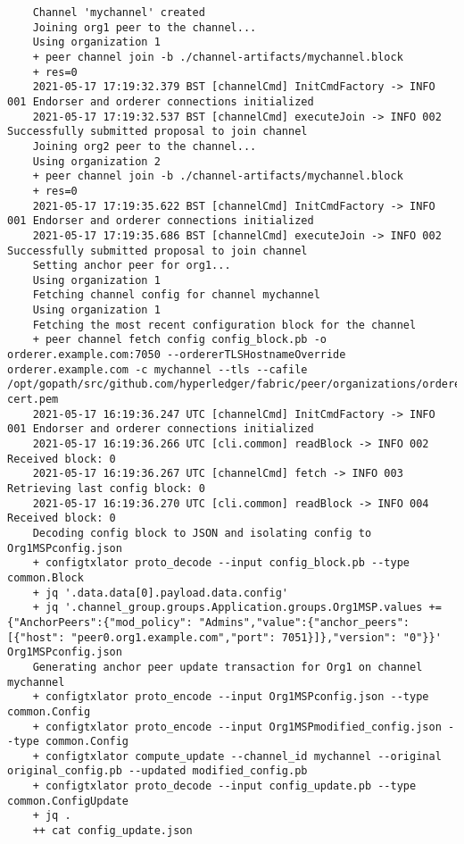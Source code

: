 \begin{lstlisting}
    Channel 'mychannel' created
    Joining org1 peer to the channel...
    Using organization 1
    + peer channel join -b ./channel-artifacts/mychannel.block
    + res=0
    2021-05-17 17:19:32.379 BST [channelCmd] InitCmdFactory -> INFO 001 Endorser and orderer connections initialized
    2021-05-17 17:19:32.537 BST [channelCmd] executeJoin -> INFO 002 Successfully submitted proposal to join channel
    Joining org2 peer to the channel...
    Using organization 2
    + peer channel join -b ./channel-artifacts/mychannel.block
    + res=0
    2021-05-17 17:19:35.622 BST [channelCmd] InitCmdFactory -> INFO 001 Endorser and orderer connections initialized
    2021-05-17 17:19:35.686 BST [channelCmd] executeJoin -> INFO 002 Successfully submitted proposal to join channel
    Setting anchor peer for org1...
    Using organization 1
    Fetching channel config for channel mychannel
    Using organization 1
    Fetching the most recent configuration block for the channel
    + peer channel fetch config config_block.pb -o orderer.example.com:7050 --ordererTLSHostnameOverride orderer.example.com -c mychannel --tls --cafile /opt/gopath/src/github.com/hyperledger/fabric/peer/organizations/ordererOrganizations/example.com/orderers/orderer.example.com/msp/tlscacerts/tlsca.example.com-cert.pem
    2021-05-17 16:19:36.247 UTC [channelCmd] InitCmdFactory -> INFO 001 Endorser and orderer connections initialized
    2021-05-17 16:19:36.266 UTC [cli.common] readBlock -> INFO 002 Received block: 0
    2021-05-17 16:19:36.267 UTC [channelCmd] fetch -> INFO 003 Retrieving last config block: 0
    2021-05-17 16:19:36.270 UTC [cli.common] readBlock -> INFO 004 Received block: 0
    Decoding config block to JSON and isolating config to Org1MSPconfig.json
    + configtxlator proto_decode --input config_block.pb --type common.Block
    + jq '.data.data[0].payload.data.config'
    + jq '.channel_group.groups.Application.groups.Org1MSP.values += {"AnchorPeers":{"mod_policy": "Admins","value":{"anchor_peers": [{"host": "peer0.org1.example.com","port": 7051}]},"version": "0"}}' Org1MSPconfig.json
    Generating anchor peer update transaction for Org1 on channel mychannel
    + configtxlator proto_encode --input Org1MSPconfig.json --type common.Config
    + configtxlator proto_encode --input Org1MSPmodified_config.json --type common.Config
    + configtxlator compute_update --channel_id mychannel --original original_config.pb --updated modified_config.pb
    + configtxlator proto_decode --input config_update.pb --type common.ConfigUpdate
    + jq .
    ++ cat config_update.json

\end{lstlisting}
